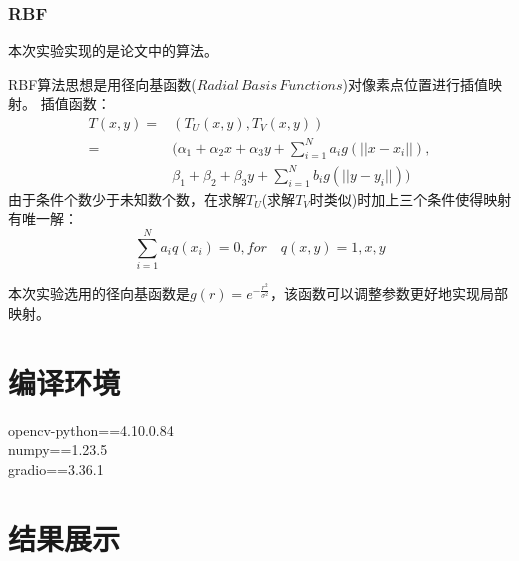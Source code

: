 \documentclass{article}
\begin{document}
	\subsubsection{RBF}
	本次实验实现的是论文\cite{RBF}中的算法。
	
	RBF算法思想是用径向基函数($Radial\,Basis\,Functions$)对像素点位置进行插值映射。
	插值函数：
	\begin{equation}
		\begin{aligned}
			T(x,y)=&(T_U(x,y),T_V(x,y))\\
			=&(\alpha_1+\alpha_2x+\alpha_3y+\sum_{i=1}^{N}a_ig(||x-x_i||),\\
			&\beta_1+\beta_2+\beta_3y+\sum_{i=1}^{N}b_ig(||y-y_i||))
		\end{aligned}
	\end{equation}
	由于条件个数少于未知数个数，在求解$T_U$(求解$T_V$时类似)时加上三个条件使得映射有唯一解：
	$$\sum_{i=1}^{N}a_iq(x_i)=0,for\quad q(x,y)=1,x,y$$
	
	本次实验选用的径向基函数是$g(r)=e^{-\frac{r^2}{\sigma^2}}$，该函数可以调整参数更好地实现局部映射。
	
	\section{编译环境}\noindent
	opencv-python==4.10.0.84\\
	numpy==1.23.5\\
	gradio==3.36.1
	\section{结果展示}
\end{document}
